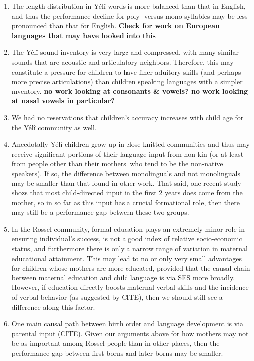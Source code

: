 \documentclass[english,,man,floatsintext]{apa6}
\providecommand{\tightlist}{%
  \setlength{\itemsep}{0pt}\setlength{\parskip}{0pt}}
\begin{document}
\begin{enumerate}
\def\labelenumi{\arabic{enumi}.}
\tightlist
\item
  The length distribution in Yélî words is more balanced than that in English, and thus the performance decline for poly- versus mono-syllables may be less pronounced than that for English. \textbf{Check for work on European languages that may have looked into this}
\item
  The Yélî sound inventory is very large and compressed, with many similar sounds that are acoustic and articulatory neighbors. Therefore, this may constitute a pressure for children to have finer aduitory skills (and perhaps more precise articulations) than children speaking languages with a simpler inventory. \textbf{no work looking at consonants \& vowels? no work looking at nasal vowels in particular?}
\item
  We had no reservations that children's accuracy increases with child age for the Yélî community as well.
\item
  Anecdotally Yélî children grow up in close-knitted communities and thus may receive significant portions of their language input from non-kin (or at least from people other than their mothers, who tend to be the non-native speakers). If so, the difference between monolinguals and not monolinguals may be smaller than that found in other work. That said, one recent study shozs that most child-directed input in the first 2 years does come from the mother, so in so far as this input has a crucial formational role, then there may still be a performance gap between these two groups.
\item
  In the Rossel community, formal education plays an extremely minor role in ensuring individual's success, is not a good index of relative socio-economic status, and furthermore there is only a narrow range of variation in maternal educational attainment. This may lead to no or only very small advantages for children whose mothers are more educated, provided that the causal chain between maternal education and child language is via SES more broadly. However, if education directly boosts maternal verbal skills and the incidence of verbal behavior (as suggested by CITE), then we should still see a difference along this factor.
\item
  One main causal path between birth order and language development is via parental input (CITE). Given our arguments above for how mothers may not be as important among Rossel people than in other places, then the performance gap between first borns and later borns may be smaller.
\end{enumerate}
\end{document}
